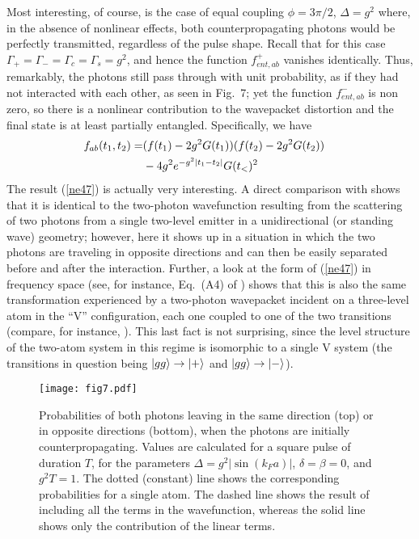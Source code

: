 \documentclass[aps,pra,twocolumn,floatfix,superscriptaddress]{revtex4}
\begin{document}
Most interesting, of course, is the case of equal coupling $\phi=3\pi/2$, $\Delta=g^2$ where, in the absence of nonlinear effects, both counterpropagating photons would be perfectly transmitted, regardless of the pulse shape.  Recall that for this case $\Gamma_+ =\Gamma_- = \Gamma_c = \Gamma_s = g^2$, and hence the function $f^+_{ent,ab}$ vanishes identically.  Thus, remarkably, the photons still pass through with unit probability, as if they had not interacted with each other, as seen in Fig.~7; yet the function $f^-_{ent,ab}$ is non zero, so there is a nonlinear contribution to the wavepacket distortion and the final state is at least partially entangled.  Specifically, we have
\begin{align}
f_{ab}(t_1,t_2) = &(f(t_1)-2g^2 G(t_1))(f(t_2)-2g^2 G(t_2)) \cr
&- 4 g^2 e^{-g^2|t_1-t_2|}G(t_<)^2
\label{ne47}
\end{align}
The result (\ref{ne47}) is actually very interesting.  A direct comparison with \cite{us} shows that it is identical to the two-photon wavefunction resulting from the scattering of two photons from a single two-level emitter in a unidirectional (or standing wave) geometry; however, here it shows up in a situation in which the two photons are traveling in opposite directions and can then be easily separated before and after the interaction.  Further, a look at the form of (\ref{ne47}) in frequency space (see, for instance, Eq.~(A4) of \cite{us}) shows that this is also the same transformation experienced by a two-photon wavepacket incident on a three-level atom in the ``V'' configuration, each one coupled to one of the two transitions (compare, for instance, \cite{chudziki,brod2}).  This last fact is not surprising, since the level structure of the two-atom system in this regime is isomorphic to a single V system (the transitions in question being $|gg\rangle\to |+\rangle$ and  $|gg\rangle\to |-\rangle$).

\begin{figure}
\texttt{[image: fig7.pdf]}
\caption{\label{fig7} Probabilities of both photons leaving in the same direction (top) or in opposite directions (bottom), when the photons are initially counterpropagating. Values are calculated for a square pulse of duration $T$, for the parameters $\Delta =g^2  |\sin(k_F a)|$, $\delta =\beta =0$, and $g^2 T=1$.  The dotted (constant) line shows the corresponding probabilities for a single atom. The dashed line shows the result of including all the terms in the wavefunction, whereas the solid line shows only the contribution of the linear terms.}  %
\end{figure}
\end{document}
